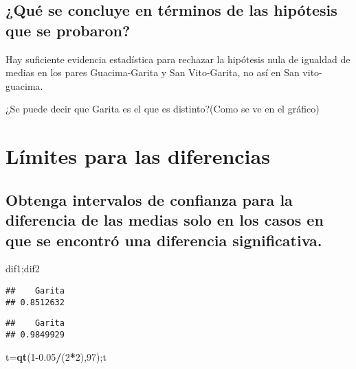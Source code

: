 \documentclass[
]{article}
\newenvironment{Shaded}{\begin{snugshade}}{\end{snugshade}}
\newcommand{\DecValTok}[1]{\textcolor[rgb]{0.00,0.00,0.81}{#1}}
\newcommand{\FloatTok}[1]{\textcolor[rgb]{0.00,0.00,0.81}{#1}}
\newcommand{\FunctionTok}[1]{\textcolor[rgb]{0.13,0.29,0.53}{\textbf{#1}}}
\newcommand{\NormalTok}[1]{#1}
\newcommand{\OtherTok}[1]{\textcolor[rgb]{0.56,0.35,0.01}{#1}}
\newcommand{\SpecialCharTok}[1]{\textcolor[rgb]{0.81,0.36,0.00}{\textbf{#1}}}
\begin{document}
\hypertarget{quuxe9-se-concluye-en-tuxe9rminos-de-las-hipuxf3tesis-que-se-probaron}{%
\subsection{¿Qué se concluye en términos de las hipótesis que se
probaron?}\label{quuxe9-se-concluye-en-tuxe9rminos-de-las-hipuxf3tesis-que-se-probaron}}

Hay suficiente evidencia estadística para rechazar la hipótesis nula de
igualdad de medias en los pares Guacima-Garita y San Vito-Garita, no así
en San vito-guacima.

¿Se puede decir que Garita es el que es distinto?(Como se ve en el
gráfico)

\hypertarget{luxedmites-para-las-diferencias}{%
\section{Límites para las
diferencias}\label{luxedmites-para-las-diferencias}}

\hypertarget{obtenga-intervalos-de-confianza-para-la-diferencia-de-las-medias-solo-en-los-casos-en-que-se-encontruxf3-una-diferencia-significativa.}{%
\subsection{Obtenga intervalos de confianza para la diferencia de las
medias solo en los casos en que se encontró una diferencia
significativa.}\label{obtenga-intervalos-de-confianza-para-la-diferencia-de-las-medias-solo-en-los-casos-en-que-se-encontruxf3-una-diferencia-significativa.}}

\begin{Shaded}
\begin{Highlighting}[]
\NormalTok{dif1;dif2}
\end{Highlighting}
\end{Shaded}

\begin{verbatim}
##    Garita 
## 0.8512632
\end{verbatim}

\begin{verbatim}
##    Garita 
## 0.9849929
\end{verbatim}

\begin{Shaded}
\begin{Highlighting}[]
\NormalTok{t}\OtherTok{=}\FunctionTok{qt}\NormalTok{(}\DecValTok{1}\FloatTok{{-}0.05}\SpecialCharTok{/}\NormalTok{(}\DecValTok{2}\SpecialCharTok{*}\DecValTok{2}\NormalTok{),}\DecValTok{97}\NormalTok{);t}
\end{Highlighting}
\end{Shaded}
\end{document}
